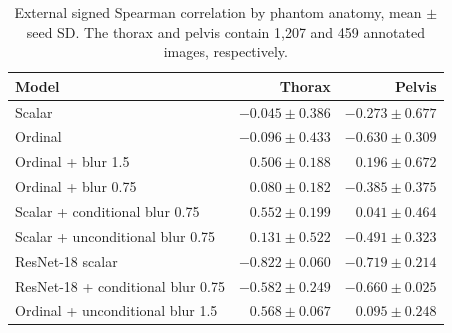 \begin{table}[ht]\centering\small
\caption{External signed Spearman correlation by phantom anatomy, mean $\pm$ seed SD. The thorax and pelvis contain 1,207 and 459 annotated images, respectively.}
\begin{tabular}{lrr}\toprule Model & Thorax & Pelvis \\ \midrule
Scalar & $-0.045\pm0.386$ & $-0.273\pm0.677$ \\
Ordinal & $-0.096\pm0.433$ & $-0.630\pm0.309$ \\
Ordinal + blur 1.5 & $0.506\pm0.188$ & $0.196\pm0.672$ \\
Ordinal + blur 0.75 & $0.080\pm0.182$ & $-0.385\pm0.375$ \\
Scalar + conditional blur 0.75 & $0.552\pm0.199$ & $0.041\pm0.464$ \\
Scalar + unconditional blur 0.75 & $0.131\pm0.522$ & $-0.491\pm0.323$ \\
ResNet-18 scalar & $-0.822\pm0.060$ & $-0.719\pm0.214$ \\
ResNet-18 + conditional blur 0.75 & $-0.582\pm0.249$ & $-0.660\pm0.025$ \\
Ordinal + unconditional blur 1.5 & $0.568\pm0.067$ & $0.095\pm0.248$ \\
\bottomrule\end{tabular}\label{tab:anatomy}\end{table}
